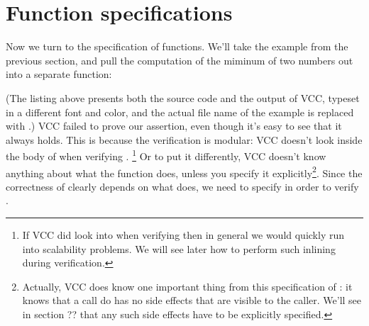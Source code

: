 \section{Function specifications}

Now we turn to the specification of functions. We'll take the example
from the previous section, and pull the computation of the miminum of
two numbers out into a separate function:


(The listing above presents both the source code and the output
of VCC, typeset in a different font and color, and 
the actual file name of the example is replaced with .)
VCC failed to prove our assertion, even though it's easy to see that
it always holds. This is because the verification is modular: VCC
doesn't look inside the body of  when verifying .%
\footnote{
  If VCC did look into  when verifying 
  then in general we would quickly run into scalability problems.
  We will see later how to perform such inlining during verification.
}
Or to put it differently, VCC doesn't know anything about what the
 function does, unless you specify it explicitly\footnote{
  Actually, VCC does know one important thing from this specification
  of : it knows that a call do  has no side
  effects that are visible to the caller. We'll see in section ?? that
  any such side effects have to be explicitly specified.
}.
Since the correctness of  clearly depends on what 
does, we need to specify  in order to verify .

